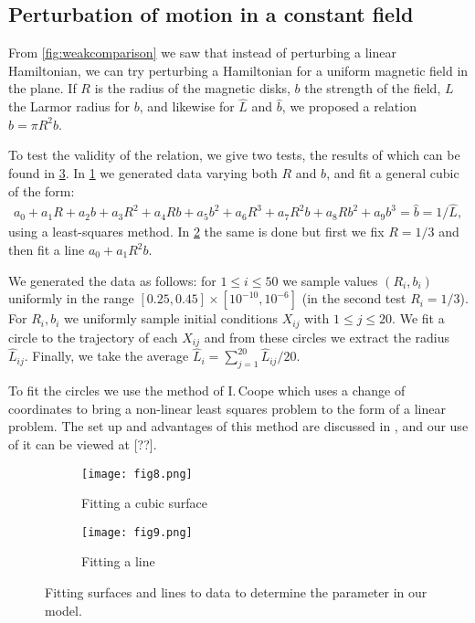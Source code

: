 \subsection{Perturbation of motion in a constant field}

From \cref{fig:weakcomparison} we saw that instead of perturbing a linear Hamiltonian, we can try perturbing a Hamiltonian for a uniform magnetic field in the plane. If $R$ is the radius of the magnetic disks, $b$ the strength of the field, $L$ the Larmor radius for $b$, and likewise for $\hat L$ and $\hat b$, we proposed a relation $\hat b = \pi R^2b$. 



To test the validity of the relation, we give two tests, the results of which can be found in \cref{fig:modeling}. In \cref{subfig:3dfitting} we generated data varying both $R$ and $b$, and fit a general cubic of the form:
\begin{align*}
a_0 + a_1R + a_2b + a_3R^2 + a_4Rb + a_5b^2 + a_6R^3 +a_7R^2b+a_8Rb^2+a_9b^3=\hat b =1/\hat L,
\end{align*}
using a least-squares method. In \cref{subfig:2dfitting} the same is done but first we fix $R=1/3$ and then fit a line $a_0+a_1R^2b$.

We generated the data as follows: for $1\le i\le 50$ we sample values $(R_i, b_i)$ uniformly in the range $[0.25,0.45]\times[10^{-10},10^{-6}]$ (in the second test $R_i=1/3$). For $R_i, b_i$ we uniformly sample initial conditions $X_{ij}$ with $1\le j\le 20$. We fit a circle to the trajectory of each $X_{ij}$ and from these circles we extract the radius $\hat L_{ij}$. Finally, we take the average $\hat L_i=\sum_{j=1}^{20}\hat L_{ij}/20$. 

To fit the circles we use the method of I.\,Coope which uses a change of coordinates to bring a non-linear least squares problem to the form of a linear problem. The set up and advantages of this method are discussed in \cite{Coope93}, and our use of it can be viewed at [??]. 

\begin{figure}[!ht]
\centering
\begin{subfigure}[!th]{0.49\textwidth}
\texttt{[image: fig8.png]}
\caption{Fitting a cubic surface}
\label{subfig:3dfitting}
\end{subfigure}
%
\begin{subfigure}[!th]{0.49\textwidth}
\texttt{[image: fig9.png]}
\caption{Fitting a line}
\label{subfig:2dfitting}
\end{subfigure}
\caption{Fitting surfaces and lines to data to determine the parameter in our model.}
\label{fig:modeling}
\end{figure}

